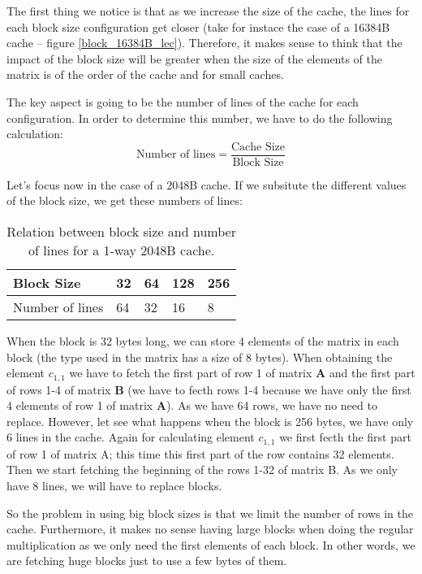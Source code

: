\documentclass{article}
\begin{document}
\pagebreak 
The first thing we notice is that as we increase the size of the cache, the lines for each block size configuration get closer (take for instace the case of a 16384B cache -- figure \ref{block_16384B_lec}).  Therefore, it makes sense to think that the impact of the block size will be greater when the size of the elements of the matrix is of the order of the cache and for small caches.

The key aspect is going to be the number of lines of the cache for each configuration. In order to determine this number, we have to do the following calculation: 
\[
\text{Number of lines} = \frac{\text{Cache Size}}{\text{Block Size}}
\]

Let's focus now in the case of a 2048B cache. If we subsitute the different values of the block size, we get these numbers of lines:

{
\begin{table}[!ht]
    \centering
    \begin{tabular}{lllll}
    \hline
    \multicolumn{1}{|l|}{Block Size}      & \multicolumn{1}{l|}{32} & \multicolumn{1}{l|}{64} & \multicolumn{1}{l|}{128} & \multicolumn{1}{l|}{256} \\ \hline
    \multicolumn{1}{|l|}{Number of lines} & \multicolumn{1}{l|}{64} & \multicolumn{1}{l|}{32} & \multicolumn{1}{l|}{16}  & \multicolumn{1}{l|}{8}   \\ \hline                    
    \end{tabular}
    \caption{\label{tab:table-name}Relation between block size and number of lines for a 1-way 2048B cache.}
\end{table}
}


When the block is 32 bytes long, we can store 4 elements of the matrix in each block (the type used in the matrix has a size of 8 bytes). When obtaining the element $c_{1,1}$ we have to fetch the first part of row 1 of matrix $\mathbf{A}$ and the first part of rows 1-4 of matrix $\mathbf{B}$ (we have to fecth rows 1-4 because we have only the first 4 elements of row 1 of matrix $\mathbf{A}$). As we have 64 rows, we have no need to replace. However, let see what happens when the block is 256 bytes, we have only 6 lines in the cache. Again for calculating element $c_{1,1}$ we first fecth the first part of row 1 of matrix A; this time this first part of the row contains 32 elements. Then we start fetching the beginning of the rows 1-32 of matrix B. As we only have 8 lines, we will have to replace blocks. 

So the problem in using big block sizes is that we limit the number of rows in the cache. Furthermore, it makes no sense having large blocks when doing the regular multiplication as we only need the first elements of each block. In other words, we are fetching huge blocks just to use a few bytes of them.
\end{document}

